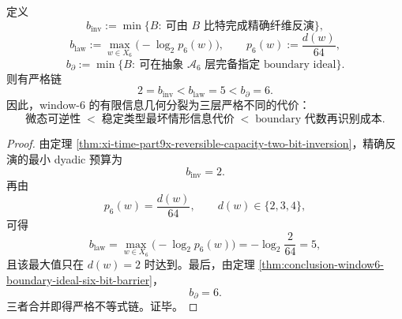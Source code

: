 \begin{corollary}\label{cor:conclusion-window6-three-information-thresholds}
定义
\[
b_{\mathrm{inv}}
:=
\min\{B:\ \text{可由 }B\text{ 比特完成精确纤维反演}\},
\]
\[
b_{\mathrm{law}}
:=
\max_{w\in X_6}\bigl(-\log_2 p_6(w)\bigr),
\qquad
p_6(w):=\frac{d(w)}{64},
\]
\[
b_{\partial}
:=
\min\{B:\ \text{可在抽象 }\mathcal A_6\text{ 层完备指定 boundary ideal}\}.
\]
则有严格链
\[
2=b_{\mathrm{inv}}<b_{\mathrm{law}}=5<b_{\partial}=6.
\]
因此，window-\(6\) 的有限信息几何分裂为三层严格不同的代价：
\[
\text{微态可逆性}
\;<\;
\text{稳定类型最坏情形信息代价}
\;<\;
\text{boundary 代数再识别成本}.
\]
\end{corollary}
\begin{proof}
由定理 \ref{thm:xi-time-part9x-reversible-capacity-two-bit-inversion}，精确反演的最小 dyadic 预算为
\[
b_{\mathrm{inv}}=2.
\]
再由
\[
p_6(w)=\frac{d(w)}{64},
\qquad
d(w)\in\{2,3,4\},
\]
可得
\[
b_{\mathrm{law}}
=
\max_{w\in X_6}\bigl(-\log_2 p_6(w)\bigr)
=
-\log_2\frac{2}{64}
=
5,
\]
且该最大值只在 \(d(w)=2\) 时达到。最后，由定理 \ref{thm:conclusion-window6-boundary-ideal-six-bit-barrier}，
\[
b_{\partial}=6.
\]
三者合并即得严格不等式链。证毕。
\end{proof}

